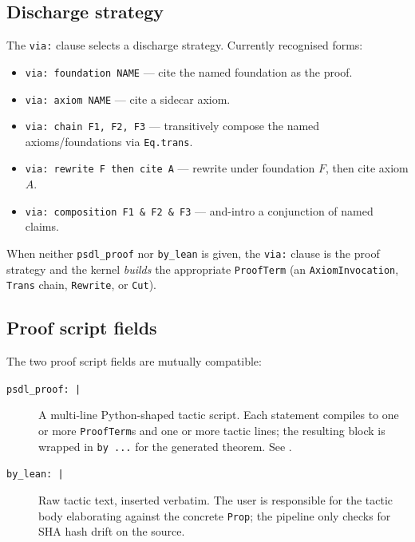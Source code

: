 \subsection{Discharge strategy}

The \texttt{via:} clause selects a discharge strategy.  Currently
recognised forms:

\begin{itemize}[leftmargin=1.7em]
  \item \texttt{via: foundation NAME} --- cite the named foundation
    as the proof.
  \item \texttt{via: axiom NAME} --- cite a sidecar axiom.
  \item \texttt{via: chain F1, F2, F3} --- transitively compose the
    named axioms/foundations via \texttt{Eq.trans}.
  \item \texttt{via: rewrite F then cite A} --- rewrite under
    foundation $F$, then cite axiom $A$.
  \item \texttt{via: composition F1 \& F2 \& F3} --- and-intro a
    conjunction of named claims.
\end{itemize}

When neither \texttt{psdl\_proof} nor \texttt{by\_lean} is given, the
\texttt{via:} clause is the proof strategy and the kernel \emph{builds}
the appropriate \texttt{ProofTerm} (an \texttt{AxiomInvocation},
\texttt{Trans} chain, \texttt{Rewrite}, or \texttt{Cut}).

\subsection{Proof script fields}

The two proof script fields are mutually compatible:

\begin{description}
  \item[\texttt{psdl\_proof: |}] A multi-line Python-shaped tactic
  script.  Each statement compiles to one or more
  \texttt{ProofTerm}s and one or more \Lean{} tactic lines; the
  resulting \Lean{} block is wrapped in \texttt{by ...} for the
  generated theorem.  See .

  \item[\texttt{by\_lean: |}] Raw \Lean{} tactic text, inserted
  verbatim.  The user is responsible for the tactic body
  elaborating against the concrete \texttt{Prop}; the \Deppy{}
  pipeline only checks for SHA hash drift on the source.
\end{description}

